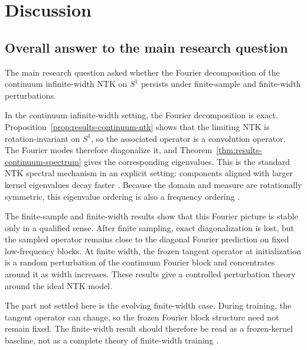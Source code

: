 \chapter{\label{cha:discussion}Discussion}

\section{Overall answer to the main research question}
\label{sec:discussion-main-question}

The main research question asked whether the Fourier decomposition of the
continuum infinite-width NTK on \(S^1\) persists under finite-sample and
finite-width perturbations.

In the continuum infinite-width setting, the Fourier decomposition is exact.
Proposition~\ref{prop:results-continuum-ntk} shows that the limiting NTK is
rotation-invariant on \(S^1\), so the associated operator is a convolution
operator. The Fourier modes therefore diagonalize it, and
Theorem~\ref{thm:results-continuum-spectrum} gives the corresponding
eigenvalues. This is the standard NTK spectral mechanism in an explicit setting:
components aligned with larger kernel eigenvalues decay faster
\citep{jacot2018ntk,lee2020wide,cao2020understandingspectralbiasdeep}. Because
the domain and measure are rotationally symmetric, this eigenvalue ordering is
also a frequency ordering
\citep{bietti2019inductivebiasneuraltangent,basri2019convergence,basri2020frequencybiasneuralnetworks}.

The finite-sample and finite-width results show that this Fourier picture is
stable only in a qualified sense. After finite sampling, exact diagonalization
is lost, but the sampled operator remains close to the diagonal Fourier
prediction on fixed low-frequency blocks. At finite width, the frozen tangent
operator at initialization is a random perturbation of the continuum Fourier
block and concentrates around it as width increases. These results give a
controlled perturbation theory around the ideal NTK model.

The part not settled here is the evolving finite-width case. During training,
the tangent operator can change, so the frozen Fourier block structure need not
remain fixed. The finite-width result should therefore be read as a
frozen-kernel baseline, not as a complete theory of finite-width training
\citep{bordelon2023dynamicsfinitewidthkernel,vyas2022limitationsntkunderstandinggeneralization,golikov2022neuraltangentkernelsurvey}.

